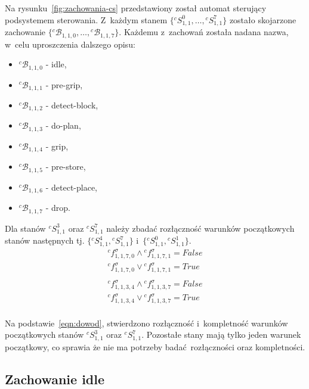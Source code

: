 Na rysunku~\ref{fig:zachowania-cs} przedstawiony został automat sterujący podsystemem sterowania. Z~każdym stanem $\{ {}^{c}S_{1,1}^0, \hdots, {}^{c}S_{1,1}^7 \}$ zostało skojarzone zachowanie $\{ {}^{c}\mathcal{B}_{1,1,0}, \hdots, {}^{c}\mathcal{B}_{1,1,7} \}$. Każdemu z~zachowań została nadana nazwa, w~celu uproszczenia dalszego opisu:
\begin{itemize}
    \item ${}^{c}\mathcal{B}_{1,1,0}$ - idle,
    \item ${}^{c}\mathcal{B}_{1,1,1}$ - pre-grip,
    \item ${}^{c}\mathcal{B}_{1,1,2}$ - detect-block,
    \item ${}^{c}\mathcal{B}_{1,1,3}$ - do-plan,
    \item ${}^{c}\mathcal{B}_{1,1,4}$ - grip,
    \item ${}^{c}\mathcal{B}_{1,1,5}$ - pre-store,
    \item ${}^{c}\mathcal{B}_{1,1,6}$ - detect-place,
    \item ${}^{c}\mathcal{B}_{1,1,7}$ - drop.
\end{itemize}

Dla stanów ${}^{c}S_{1,1}^{3}$ oraz ${}^{c}S_{1,1}^{7}$ należy zbadać rozłączność warunków początkowych stanów następnych tj. $\{ {}^{c}S_{1,1}^{4}, {}^{c}S_{1,1}^{7} \}$ i~$\{ {}^{c}S_{1,1}^{0}, {}^{c}S_{1,1}^{1} \}$. 
\medskip
\begin{equation}
    \begin{gathered}
        {}^{c}f^{\sigma}_{1,1,7,0} \land {}^{c}f^{\sigma}_{1,1,7,1} = False\\
        {}^{c}f^{\sigma}_{1,1,7,0} \lor {}^{c}f^{\sigma}_{1,1,7,1} = True \\
        \\
        {}^{c}f^{\sigma}_{1,1,3,4} \land {}^{c}f^{\sigma}_{1,1,3,7} = False\\
        {}^{c}f^{\sigma}_{1,1,3,4} \lor {}^{c}f^{\sigma}_{1,1,3,7} = True \\
    \end{gathered}
    \label{eqn:dowod}
\end{equation}
\medskip


Na podstawie~\ref{eqn:dowod}, stwierdzono rozłączność i~kompletność warunków początkowych stanów ${}^{c}S_{1,1}^{3}$ oraz ${}^{c}S_{1,1}^{7}$. Pozostałe stany mają tylko jeden warunek początkowy, co sprawia że nie ma potrzeby badać rozłączności oraz kompletności.

\subsection{Zachowanie idle}
\label{subsec:cs-idle}

